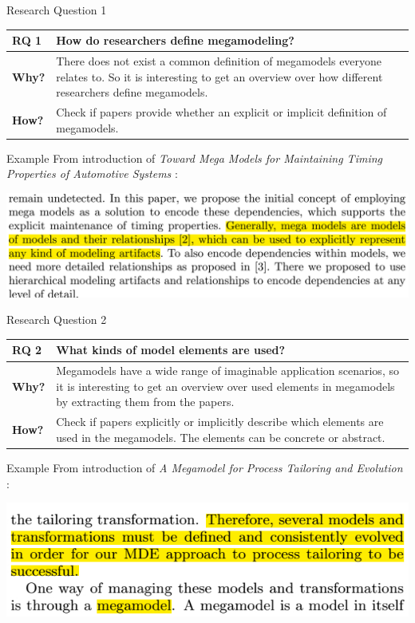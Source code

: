 \documentclass{beamer}
\begin{document}
\begin{frame}{Research Question 1}
\begin{tabular}{|l|p{9cm}|}\hline
\textbf{RQ 1} & How do researchers define megamodeling?\\\hline
\textbf{Why?} & There does not exist a common definition of me\-ga\-mo\-dels everyone relates to. So it is interesting to get an overview over how different researchers define megamodels.\\\hline
\textbf{How?} & Check if papers provide whether an explicit or implicit definition of megamodels.\\\hline
\end{tabular}
\end{frame}

\begin{frame}{Example}
From introduction of \textit{Toward Mega Models for Maintaining Timing Properties of Automotive Systems} \cite{Neumann_models2010}:
\begin{center}
\includegraphics[width=1.0\textwidth]{ex_rq1}
\end{center}
\end{frame}

\begin{frame}{Research Question 2}
\begin{tabular}{|l|p{9cm}|}\hline
\textbf{RQ 2} & What kinds of model elements are used?\\\hline
\textbf{Why?} & Megamodels have a wide range of imaginable application scenarios, so it is interesting to get an overview over used elements in megamodels by extracting them from the papers.\\\hline
\textbf{How?} & Check if papers explicitly or implicitly describe which elements are used in the megamodels. The elements can be concrete or abstract.\\\hline
\end{tabular}
\end{frame}

\begin{frame}{Example}
From introduction of \textit{A Megamodel for Process Tailoring and Evolution} \cite{tailoring}:
\begin{center}
\includegraphics[width=1.0\textwidth]{ex_rq2}
\end{center}
\end{frame}
\end{document}
